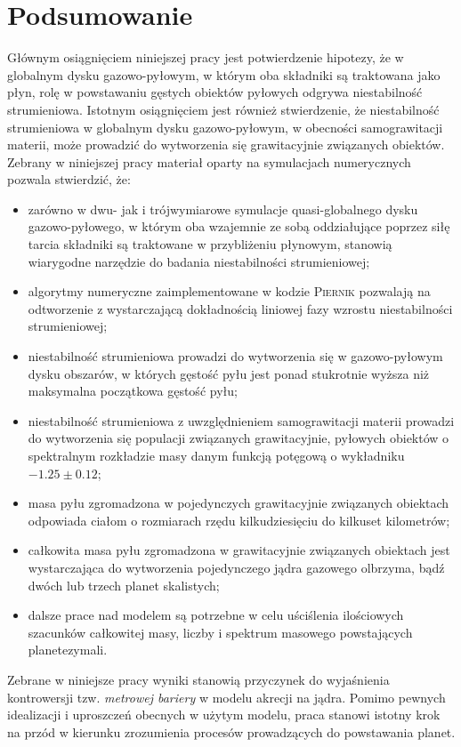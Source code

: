 
\chapter{Podsumowanie}

Głównym osiągnięciem niniejszej pracy jest potwierdzenie hipotezy, że w globalnym
dysku gazowo-pyłowym, w którym oba składniki są traktowana jako płyn, rolę w
powstawaniu gęstych obiektów pyłowych odgrywa niestabilność strumieniowa. 
Istotnym osiągnięciem jest również stwierdzenie, że niestabilność
strumieniowa w globalnym dysku gazowo-pyłowym, w obecności samograwitacji
materii, może prowadzić do wytworzenia się grawitacyjnie związanych obiektów.
Zebrany w niniejszej pracy materiał oparty na symulacjach numerycznych
pozwala stwierdzić, że:

\begin{itemize}
   \item zarówno w dwu- jak i trójwymiarowe symulacje quasi-globalnego dysku
      gazowo-pyłowego, w którym oba wzajemnie ze sobą oddziałujące poprzez siłę
      tarcia składniki są traktowane w przybliżeniu płynowym, stanowią wiarygodne
      narzędzie do badania niestabilności strumieniowej;
   \item algorytmy numeryczne zaimplementowane w kodzie \textsc{Piernik}
      pozwalają na odtworzenie z wystarczającą dokładnością liniowej fazy
      wzrostu niestabilności strumieniowej;
   \item niestabilność strumieniowa prowadzi do wytworzenia się w gazowo-pyłowym
      dysku obszarów, w których gęstość pyłu jest ponad stukrotnie wyższa niż
      maksymalna początkowa gęstość pyłu;
   \item niestabilność strumieniowa z uwzględnieniem samograwitacji materii
      prowadzi do wytworzenia się populacji związanych grawitacyjnie, pyłowych
      obiektów o spektralnym rozkładzie masy danym funkcją potęgową o wykładniku
      $-1.25\pm0.12$;
   \item masa pyłu zgromadzona w pojedynczych grawitacyjnie związanych obiektach
      odpowiada ciałom o rozmiarach rzędu kilkudziesięciu do kilkuset
      kilometrów;
   \item całkowita masa pyłu zgromadzona w grawitacyjnie związanych obiektach
      jest wystarczająca do wytworzenia pojedynczego jądra gazowego
      olbrzyma, bądź dwóch lub trzech planet skalistych;
   \item dalsze prace nad modelem są potrzebne w celu uściślenia ilościowych
      szacunków całkowitej masy, liczby i spektrum masowego powstających
      planetezymali.
\end{itemize}
Zebrane w niniejsze pracy wyniki stanowią przyczynek do wyjaśnienia
kontrowersji tzw. \emph{metrowej bariery} w modelu akrecji na
jądra. Pomimo pewnych idealizacji i uproszczeń obecnych w użytym modelu, praca
stanowi istotny krok na przód w kierunku zrozumienia procesów
prowadzących do powstawania planet.

